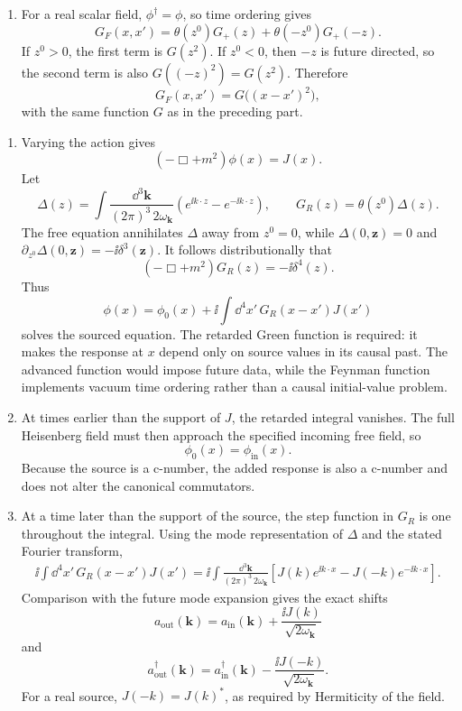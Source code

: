 \begin{enumerate}
\begin{enumerate}
\item
For a real scalar field, \(\phi^\dagger=\phi\), so time ordering gives
\[
 G_F(x,x')=
 \theta(z^0)G_+(z)+\theta(-z^0)G_+(-z).
\]
If \(z^0>0\), the first term is \(G(z^2)\).  If \(z^0<0\), then \(-z\) is
future directed, so the second term is also \(G((-z)^2)=G(z^2)\).  Therefore
\[
 G_F(x,x')=G\bigl((x-x')^2\bigr),
\]
with the same function \(G\) as in the preceding part.
\end{enumerate}

\begin{enumerate}
\item
Varying the action gives
\[
 (-\Box+m^2)\phi(x)=J(x).
\]
Let
\[
 \Delta(z)=\int\frac{\dd^3\mathbf k}{(2\pi)^3\,2\omega_{\mathbf k}}
 \left(e^{\ii k\cdot z}-e^{-\ii k\cdot z}\right),
 \qquad
 G_R(z)=\theta(z^0)\Delta(z).
\]
The free equation annihilates \(\Delta\) away from \(z^0=0\), while
\(\Delta(0,\mathbf z)=0\) and
\(\partial_{z^0}\Delta(0,\mathbf z)=-\ii\delta^3(\mathbf z)\).  It follows
distributionally that
\[
 (-\Box+m^2)G_R(z)=-\ii\delta^4(z).
\]
Thus
\[
 \phi(x)=\phi_0(x)+\ii\int \dd^4x'\,G_R(x-x')J(x')
\]
solves the sourced equation.  The retarded Green function is required: it
makes the response at \(x\) depend only on source values in its causal past.
The advanced function would impose future data, while the Feynman function
implements vacuum time ordering rather than a causal initial-value problem.

\item
At times earlier than the support of \(J\), the retarded integral vanishes.
The full Heisenberg field must then approach the specified incoming free
field, so
\[
 \phi_0(x)=\phi_{\mathrm{in}}(x).
\]
Because the source is a c-number, the added response is also a c-number and
does not alter the canonical commutators.

\item
At a time later than the support of the source, the step function in \(G_R\)
is one throughout the integral.  Using the mode representation of \(\Delta\)
and the stated Fourier transform,
\[
 \begin{split}
 \ii\int \dd^4x'\,G_R(x-x')J(x')
 =\ii\int\frac{\dd^3\mathbf k}{(2\pi)^3\,2\omega_{\mathbf k}}
 \left[J(k)e^{\ii k\cdot x}-J(-k)e^{-\ii k\cdot x}\right].
 \end{split}
\]
Comparison with the future mode expansion gives the exact shifts
\[
 \boxed{
 a_{\mathrm{out}}(\mathbf k)
 =a_{\mathrm{in}}(\mathbf k)+\frac{\ii J(k)}{\sqrt{2\omega_{\mathbf k}}}}
\]
and
\[
 a_{\mathrm{out}}^\dagger(\mathbf k)
 =a_{\mathrm{in}}^\dagger(\mathbf k)
 -\frac{\ii J(-k)}{\sqrt{2\omega_{\mathbf k}}}.
\]
For a real source, \(J(-k)=J(k)^*\), as required by Hermiticity of the field.


\end{enumerate}
\end{enumerate}

